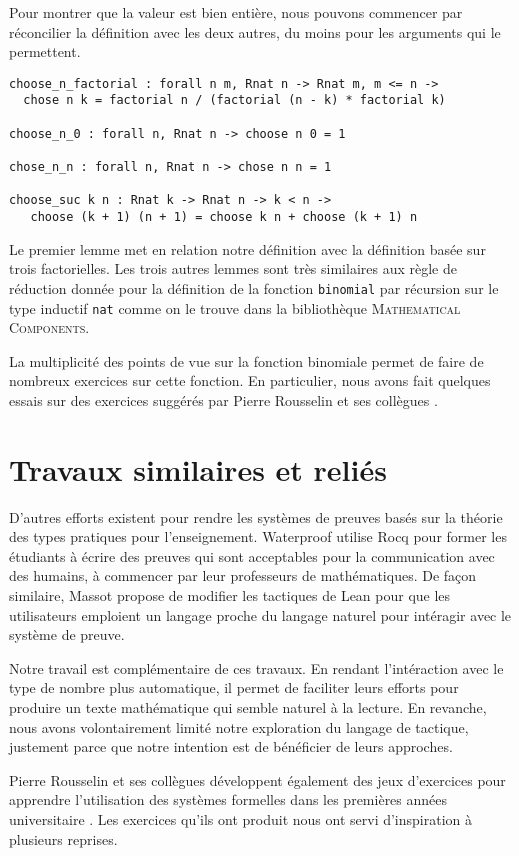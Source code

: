 \documentclass{modjflart}
\newcommand{\mathcomp}{\textsc{Mathematical Components}}
\begin{document}
Pour montrer que la valeur est bien entière, nous pouvons commencer
par réconcilier la définition avec les deux autres, du moins pour les
arguments qui le permettent.
\begin{verbatim}
choose_n_factorial : forall n m, Rnat n -> Rnat m, m <= n -> 
  chose n k = factorial n / (factorial (n - k) * factorial k)

choose_n_0 : forall n, Rnat n -> choose n 0 = 1

chose_n_n : forall n, Rnat n -> chose n n = 1

choose_suc k n : Rnat k -> Rnat n -> k < n ->
   choose (k + 1) (n + 1) = choose k n + choose (k + 1) n
\end{verbatim}
Le premier lemme met en relation notre définition avec
la définition basée sur trois factorielles.  Les trois autres
lemmes sont très similaires aux règle de réduction donnée pour
la définition de la fonction \texttt{binomial} par récursion sur le type
inductif \texttt{nat} comme on le trouve dans la bibliothèque
\mathcomp{}.

La multiplicité des points de vue sur la fonction binomiale permet de
faire de nombreux exercices sur cette fonction.  En particulier, nous
avons fait quelques essais sur des exercices suggérés par Pierre
Rousselin et ses collègues \cite{RousselinPF24}.
\section{Travaux similaires et reliés}
D'autres efforts existent pour rendre les systèmes de preuves basés
sur la théorie des types pratiques pour l'enseignement.  Waterproof
\cite{Wemmenhove_2024}
utilise Rocq pour former les étudiants à écrire des preuves qui sont
acceptables pour la communication avec des humains, à commencer par
leur professeurs de mathématiques.  De façon similaire, Massot
\cite{massot:LIPIcs.ITP.2024.27}
propose
de modifier les tactiques de Lean pour que les utilisateurs emploient
un langage proche du langage naturel pour intéragir avec le système de
preuve.

Notre travail est complémentaire de ces travaux.  En rendant
l'intéraction avec le type de nombre plus automatique, il permet de
faciliter leurs efforts pour produire un texte mathématique qui semble
naturel à la lecture.  En revanche, nous avons volontairement limité
notre exploration du langage de tactique, justement parce que notre
intention est de bénéficier de leurs approches.

Pierre Rousselin et ses collègues développent
également des jeux d'exercices pour apprendre l'utilisation des
systèmes formelles dans les premières années universitaire
\cite{RousselinPF24}.  Les
exercices qu'ils ont produit nous ont servi d'inspiration à plusieurs
reprises.
\end{document}
